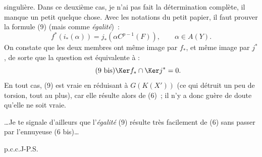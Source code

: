 singulière. Dans ce deuxième cas, je n'ai pas fait la détermination complète, il manque un petit quelque chose. Avec les notations du petit papier, il faut prouver la formule (9) (mais comme \emph{égalité})~:
\begin{equation}\tag{9}
  f^*(i_*(\alpha))=j_*(\alpha C^{p-1}(F)),\qquad \alpha\in A(Y).
\end{equation}
On constate que les deux membres ont même image par \(f_*\), et même image par \(j^*\), de sorte que la question est équivalente à :
\begin{equation}\tag{9 bis}
  \Ker f_*\cap\Ker j^*=0.
\end{equation}
En tout cas, (9) est vraie en réduisant à \(G(K(X'))\) (ce qui détruit un peu de torsion, tout au plus), car elle résulte alors de (6)~; il n'y a donc guère de doute qu'elle ne soit vraie.

\dots Je te signale d'ailleurs que l'\emph{égalité} (9) résulte très facilement de (6) sans passer par l'ennuyeuse (6 bis)\dots

\begin{flushleft}
p.c.c.J-P.S.
\end{flushleft}

\newpage
